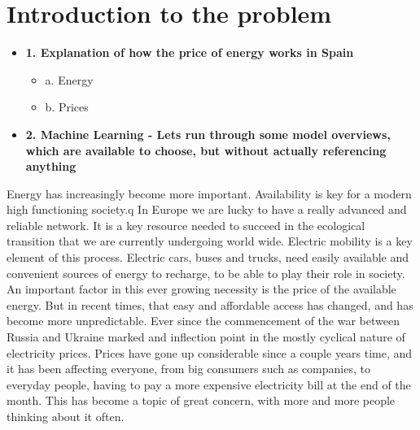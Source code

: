 \documentclass[12pt]{report} %
\begin{document}
\clearpage
{} %





\chapter{Introduction to the problem}
    \begin{itemize}
    \item \textbf{1. Explanation of how the price of energy works in Spain}
        \begin{itemize}
        \item a. Energy
        \item b. Prices
        \end{itemize}
    \item \textbf{2. Machine Learning - Lets run through some model overviews, which are available to choose, but without actually referencing anything}
    \end{itemize}

Energy has increasingly become more important.
Availability is key for a modern high functioning society.q
In Europe we are lucky to have a really advanced and reliable network.
It is a key resource needed to succeed in the ecological transition that we are currently undergoing world wide.
Electric mobility is a key element of this process.
Electric cars, buses and trucks, need easily available and convenient sources of energy to recharge, to be able to play their role in society.
An important factor in this ever growing necessity is the price of the available energy.
But in recent times, that easy and affordable access has changed, and has become more unpredictable.
Ever since the commencement of the war between Russia and Ukraine marked and inflection point in the mostly cyclical nature of electricity prices.
Prices have gone up considerable since a couple years time, and it has been affecting everyone, from big consumers such as companies, to everyday people, having to pay a more expensive electricity bill at the end of the month.
This has become a topic of great concern, with more and more people thinking about it often.
\end{document}

